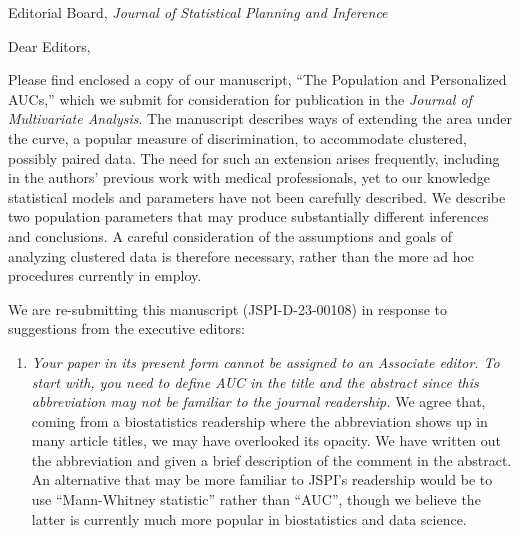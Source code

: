 \documentclass[10pt]{letter}
\begin{document}

\begin{letter}{Editorial Board, \emph{Journal of Statistical Planning and Inference} } %


\opening{Dear Editors,}

Please find enclosed a copy of our manuscript, ``The Population and
Personalized AUCs,'' which we submit for
consideration for publication in the \emph{Journal of Multivariate
  Analysis}. The manuscript describes ways of extending the area under the curve, a popular measure of discrimination, to
accommodate clustered, possibly paired data. The need for such an
extension arises frequently, including in the authors' previous work with medical professionals,
yet to our knowledge statistical models and parameters have not been
carefully described. We describe two population parameters that may
produce substantially different inferences and conclusions. A careful
consideration of the assumptions and goals of analyzing clustered data
is therefore necessary, rather than the more ad hoc procedures
currently in employ. %

We are re-submitting this manuscript (JSPI-D-23-00108) in response to suggestions from the executive editors:

\begin{enumerate}
\item \emph{Your paper in its present form cannot be assigned to an
    Associate editor. To start with, you need to define AUC in the
    title and the abstract since this abbreviation may not be familiar
    to the journal readership.}  We agree that, coming from a
  biostatistics readership where the abbreviation shows up in many
  article titles, we may have overlooked its opacity. We have written
  out the abbreviation and given a brief description of the comment in
  the abstract. An alternative that may be more familiar to JSPI's
  readership would be to use ``Mann-Whitney statistic'' rather than
  ``AUC'', though we believe the latter is currently much more popular
  in biostatistics and data science.



\end{enumerate}
\end{letter}
\end{document}
